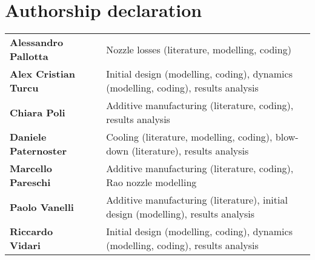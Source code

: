 \section*{Authorship declaration}

\vspace*{5mm}
\newcommand{\x}{-3mm}
{
\renewcommand{\arraystretch}{1.7}
\begin{tabular}{lll}
    \textbf{Alessandro Pallotta} & \hspace*{\x} &
    Nozzle losses (literature, modelling, coding)
    \\
    \textbf{Alex Cristian Turcu} & \hspace*{\x} &
    Initial design (modelling, coding), dynamics (modelling, coding), results analysis
    \\
    \textbf{Chiara Poli} & \hspace*{\x} &
    Additive manufacturing (literature, coding), results analysis
    \\
    \textbf{Daniele Paternoster} & \hspace*{\x} &
    Cooling (literature, modelling, coding), blow-down (literature), results analysis
    \\
    \textbf{Marcello Pareschi} & \hspace*{\x} &
    Additive manufacturing (literature, coding), Rao nozzle modelling
    \\
    \textbf{Paolo Vanelli} & \hspace*{\x} &
    Additive manufacturing (literature), initial design (modelling), results analysis
    \\
    \textbf{Riccardo Vidari} & \hspace*{\x} &
    Initial design (modelling, coding), dynamics (modelling, coding), results analysis
\end{tabular}
}